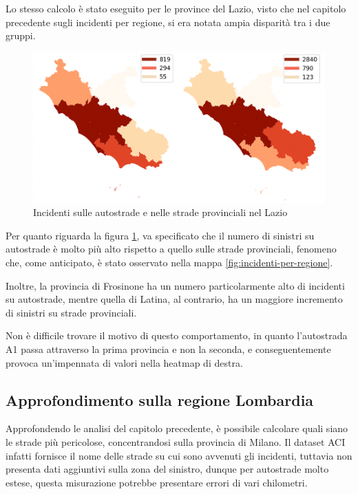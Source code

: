 \documentclass[a4paper,12pt]{report}
\begin{document}
Lo stesso calcolo è stato eseguito per le province del Lazio, visto che nel capitolo 
precedente sugli incidenti per regione, si era notata ampia disparità tra i due gruppi. 

\begin{figure}
    \includegraphics[width=\linewidth]{img_unite/lazio_autostrade_provinciali.png}
    \caption{Incidenti sulle autostrade e nelle strade provinciali nel Lazio}
    \label{fig:lazio-strade}
\end{figure}

Per quanto riguarda la figura \ref{fig:lazio-strade}, va 
specificato che il numero di sinistri su autostrade è molto più alto rispetto 
a quello sulle strade provinciali, fenomeno che, come anticipato, è stato osservato 
nella mappa \ref{fig:incidenti-per-regione}. 

Inoltre, la provincia di Frosinone ha un numero particolarmente alto di incidenti su 
autostrade, mentre quella di Latina, al contrario, ha un maggiore incremento di 
sinistri su strade provinciali. 

Non è difficile trovare il motivo di questo comportamento, in quanto l'autostrada A1 passa 
attraverso la prima provincia e non la seconda, e conseguentemente provoca 
un'impennata di valori nella heatmap di destra. 

\subsection{Approfondimento sulla regione Lombardia}

Approfondendo le analisi del capitolo precedente, è possibile calcolare quali siano 
le strade più pericolose, concentrandosi sulla provincia di Milano. 
Il dataset ACI infatti fornisce il nome delle strade su cui sono avvenuti gli incidenti, 
tuttavia non presenta dati aggiuntivi sulla zona del sinistro, dunque per autostrade molto 
estese, questa misurazione potrebbe presentare errori di vari chilometri. 
\end{document}
